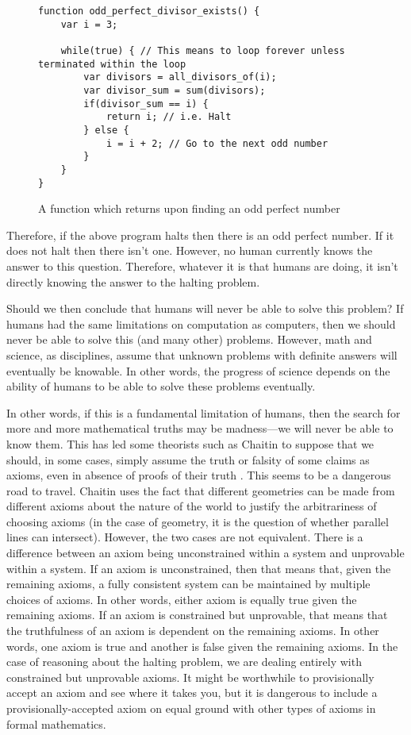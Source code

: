 \begin{figure}[H]
\begin{mdframed}
\begin{verbatim}
function odd_perfect_divisor_exists() {
	var i = 3;

	while(true) { // This means to loop forever unless terminated within the loop
		var divisors = all_divisors_of(i);
		var divisor_sum = sum(divisors);
		if(divisor_sum == i) {
			return i; // i.e. Halt
		} else {
			i = i + 2; // Go to the next odd number
		}
	}
}
\end{verbatim}
\end{mdframed}
\caption{A function which returns upon finding an odd perfect number}
\end{figure}

Therefore, if the above program halts then there is an odd perfect number.  If it does not halt then there isn't one.  However, no human currently knows the answer to this question.  Therefore, whatever it is that humans are doing, it isn't directly knowing the answer to the halting problem.

Should we then conclude that humans will never be able to solve this problem?  If humans had the same limitations on computation as computers, then we should never be able to solve this (and many other) problems.  However, math and science, as disciplines, assume that unknown problems with definite answers will eventually be knowable.  In other words, the progress of science depends on the ability of humans to be able to solve these problems eventually.

In other words, if this is a fundamental limitation of humans, then the search for more and more mathematical truths may be madness---we will never be able to know them.  This has led some theorists such as Chaitin to suppose that we should, in some cases, simply assume the truth or falsity of some claims as axioms, even in absence of proofs of their truth \citep{chaitin2006}.  This seems to be a dangerous road to travel.  Chaitin uses the fact that different geometries can be made from different axioms about the nature of the world to justify the arbitrariness of choosing axioms (in the case of geometry, it is the question of whether parallel lines can intersect).  However, the two cases are not equivalent.  There is a difference between an axiom being unconstrained within a system and unprovable within a system.  If an axiom is unconstrained, then that means that, given the remaining axioms, a fully consistent system can be maintained by multiple choices of axioms.  In other words, either axiom is equally true given the remaining axioms.  If an axiom is constrained but unprovable, that means that the truthfulness of an axiom is dependent on the remaining axioms.  In other words, one axiom is true and another is false given the remaining axioms.  In the case of reasoning about the halting problem, we are dealing entirely with constrained but unprovable axioms.  It might be worthwhile to provisionally accept an axiom and see where it takes you, but it is dangerous to include a provisionally-accepted axiom on equal ground with other types of axioms in formal mathematics.

